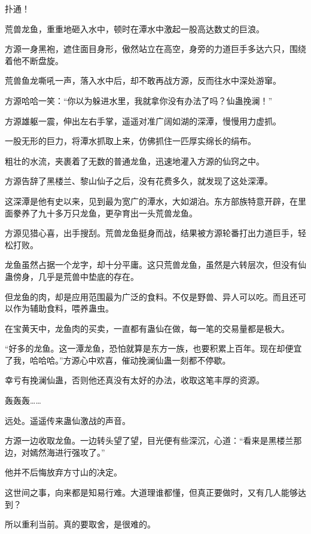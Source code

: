 
\begin{this_body}

扑通！

荒兽龙鱼，重重地砸入水中，顿时在潭水中激起一股高达数丈的巨浪。

方源一身黑袍，遮住面目身形，傲然站立在高空，身旁的力道巨手多达六只，围绕着他不断盘旋。

荒兽鱼龙嘶吼一声，落入水中后，却不敢再战方源，反而往水中深处游窜。

方源哈哈一笑：“你以为躲进水里，我就拿你没有办法了吗？仙蛊挽澜！”

方源雄躯一震，伸出左右手掌，遥遥对准广阔如湖的深潭，慢慢用力虚抓。

一股无形的巨力，将潭水抓取上来，仿佛抓住一匹厚实绵长的绢布。

粗壮的水流，夹裹着了无数的普通龙鱼，迅速地灌入方源的仙窍之中。

方源告辞了黑楼兰、黎山仙子之后，没有花费多久，就发现了这处深潭。

这深潭是他有史以来，见到最为宽广的潭水，大如湖泊。东方部族特意开辟，在里面豢养了九十多万只龙鱼，更孕育出一头荒兽龙鱼。

方源见猎心喜，出手搜刮。荒兽龙鱼挺身而战，结果被方源轮番打出力道巨手，轻松打败。

龙鱼虽然占据一个龙字，却十分平庸。这只荒兽龙鱼，虽然是六转层次，但没有仙蛊傍身，几乎是荒兽中垫底的存在。

但龙鱼的肉，却是应用范围最为广泛的食料。不仅是野兽、异人可以吃。而且还可以作为辅助食料，喂养蛊虫。

在宝黄天中，龙鱼肉的买卖，一直都有蛊仙在做，每一笔的交易量都是极大。

“好多的龙鱼。这一潭龙鱼，恐怕就算是东方一族，也要积累上百年。现在却便宜了我，哈哈哈。”方源心中欢喜，催动挽澜仙蛊一刻都不停歇。

幸亏有挽澜仙蛊，否则他还真没有太好的办法，收取这笔丰厚的资源。

轰轰轰……

远处。遥遥传来蛊仙激战的声音。

方源一边收取龙鱼。一边转头望了望，目光便有些深沉，心道：“看来是黑楼兰那边，对嫣然海进行强攻了。”

他并不后悔放弃方寸山的决定。

这世间之事，向来都是知易行难。大道理谁都懂，但真正要做时，又有几人能够达到？

所以重利当前。真的要取舍，是很难的。


\end{this_body}
